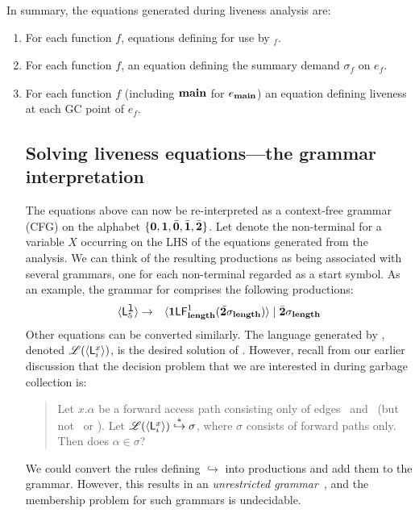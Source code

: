 \documentclass[9pt]{sigplanconf}
\newcommand{\comment}[1]{{\color{Myblue}{(#1)}}}
\begin{document}
In summary, the equations generated during liveness analysis are:
\begin{enumerate}
\item   For    each   function   $\mathit{f}$,    equations   defining
 for use by \Lfonly$_{\mathit f}$.
\item  For  each   function  $\mathit{f}$, an  equation  defining
the summary demand  $\sigma_{\mathit f}$ on $e_f$.
\item For each function $\mathit{f}$ (including $\mathbf{main}$ for
  $e_{\mathbf{main}}$) \comment{Have we defined GC points for lazy languages? No, we define it only in the implementation section as of now.}
an equation defining
  liveness at each GC point of $e_{\mathit f}$.

\subsection{Solving liveness equations---the grammar interpretation}
The  equations above can now be re-interpreted as a
context-free grammar (CFG)  on the alphabet $\lbrace\mathbf{0}, \mathbf{1},
\bar{\mathbf{0}}, \bar{\mathbf{1}}, \bar{\mathbf{2}}\rbrace$.  Let   denote the non-terminal for
a variable  $X$ occurring on  the LHS of the  equations generated
from the analysis.  We can  think of the resulting productions as
being associated with several  grammars, one for each non-terminal
 regarded as a start symbol.  As an example, the
grammar    for      comprises    the   following
productions:
 \begin{eqnarray*}
\var{\Lanv{5}{\xl}}  &\rightarrow&   \var{\acdr \Lf
  {\length}{1}{\cbar\sigma_{\length}}} \mid \cbar\sigma_{\length} \\
\end{eqnarray*}
\comment{Pick up a richer equation or more than one liveness equations}
Other equations can be converted  similarly.     The  language  generated  by  ,
denoted $\mathscr{L}(\var{\Lanv{i}{x}})
$,  is the desired  solution of
.   
However, recall from  our earlier  discussion that
the  decision problem that  we are  interested in  during garbage
collection is:
\begin{quote}
Let $x.\alpha$ be  a forward  access path  consisting  only  of   edges
\acar\  and \acdr\  (but  not \bcar\  or  \bcdr).   Let              $\mathscr{L}(\var{\Lanv{i}{x}})
\stackrel{*}{\hookrightarrow} \sigma$, where  $\sigma$  consists 
of forward paths only. Then does $\alpha \in \sigma$?
\end{quote}
We could convert  the  rules  defining  $\hookrightarrow$  into
productions and  add them to the grammar. However, this results
in  an {\em  unrestricted grammar}~\cite{hopcraft90toc},  and the
membership  problem   for  such  grammars   is
undecidable. \comment{Rewrite it to say that this is a CFG with 3
  unrestricted rules and the membership for even this grammar is undecidable}
\comment{State the undecidability of the decision problem above.}


\end{enumerate}
\end{document}
